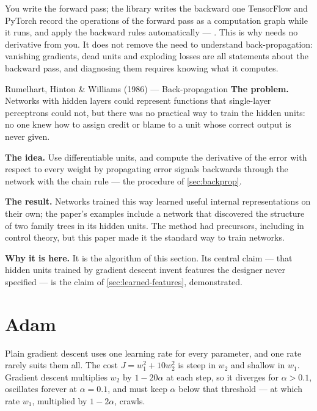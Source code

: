 \begin{keyinsight}{You write the forward pass; the library writes the backward one}
TensorFlow and PyTorch record the operations of the forward pass as a
computation graph while it runs, and apply the backward rules automatically ---
. This is why  needs no
derivative from you. It does not remove the need to understand
back-propagation: vanishing gradients, dead units and exploding losses are all
statements about the backward pass, and diagnosing them requires knowing what it
computes.
\end{keyinsight}

\begin{researchspotlight}{Rumelhart, Hinton \& Williams (1986) --- Back-propagation}
\textbf{The problem.} Networks with hidden layers could represent functions that
single-layer perceptrons could not, but there was no practical way to train the
hidden units: no one knew how to assign credit or blame to a unit whose
correct output is never given.

\textbf{The idea.} Use differentiable units, and compute the derivative of the
error with respect to every weight by propagating error signals backwards
through the network with the chain rule --- the procedure of \cref{sec:backprop}.

\textbf{The result.} Networks trained this way learned useful internal
representations on their own; the paper's examples include a network that
discovered the structure of two family trees in its hidden units. The method had
precursors, including in control theory, but this paper made it the standard way
to train networks.

\textbf{Why it is here.} It is the algorithm of this section. Its central claim
--- that hidden units trained by gradient descent invent features the designer
never specified --- is the claim of \cref{sec:learned-features}, demonstrated.
\parencite{rumelhart1986}
\end{researchspotlight}

\section{Adam}
\label{sec:adam}

Plain gradient descent uses one learning rate for every parameter, and one rate
rarely suits them all. The cost $J = w_1^2 + 10w_2^2$ is steep in $w_2$ and
shallow in $w_1$. Gradient descent multiplies $w_2$ by $1 - 20\alpha$ at each
step, so it diverges for $\alpha > 0.1$, oscillates forever at $\alpha = 0.1$,
and must keep $\alpha$ below that threshold --- at which rate $w_1$, multiplied by
$1 - 2\alpha$, crawls.

